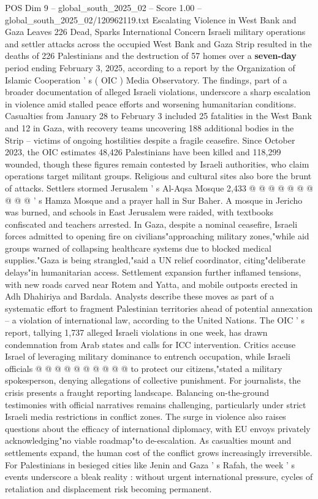 \begin{textsample}{POS Dim 9 – global\_south\_2025\_02 – Score 1.00 – global\_south\_2025\_02/120962119.txt}  \label{ex:f9_pos_399}
Escalating Violence in West Bank and Gaza Leaves 226 Dead, Sparks International Concern Israeli military operations and settler attacks across the occupied West Bank and Gaza Strip resulted in the deaths of 226 Palestinians and the destruction of 57 homes over a \textbf{seven-day} period ending February 3, 2025, according to a report by the Organization of Islamic Cooperation ' s ( OIC ) Media Observatory.
The findings, part of a broader documentation of alleged Israeli violations, underscore a sharp escalation in violence amid stalled peace efforts and worsening humanitarian conditions.
Casualties from January 28 to February 3 included 25 fatalities in the West Bank and 12 in Gaza, with recovery teams uncovering 188 additional bodies in the Strip -- victims of ongoing hostilities despite a fragile ceasefire.
Since October 2023, the OIC estimates 48,426 Palestinians have been killed and 118,299 wounded, though these figures remain contested by Israeli authorities, who claim operations target militant groups.
Religious and cultural sites also bore the brunt of attacks.
Settlers stormed Jerusalem ' s Al-Aqsa Mosque 2,433 @ @ @ @ @ @ @ @ @ @ ' s Hamza Mosque and a prayer hall in Sur Baher.
A mosque in Jericho was burned, and schools in East Jerusalem were raided, with textbooks confiscated and teachers arrested.
In Gaza, despite a nominal ceasefire, Israeli forces admitted to opening fire on civilians"approaching military zones,"while aid groups warned of collapsing healthcare systems due to blocked medical supplies."Gaza is being strangled,"said a UN relief coordinator, citing"deliberate delays"in humanitarian access.
Settlement expansion further inflamed tensions, with new roads carved near Rotem and Yatta, and mobile outposts erected in Adh Dhahiriya and Bardala.
Analysts describe these moves as part of a systematic effort to fragment Palestinian territories ahead of potential annexation -- a violation of international law, according to the United Nations.
The OIC ' s report, tallying 1,737 alleged Israeli violations in one week, has drawn condemnation from Arab states and calls for ICC intervention.
Critics accuse Israel of leveraging military dominance to entrench occupation, while Israeli officials @ @ @ @ @ @ @ @ @ @ to protect our citizens,"stated a military spokesperson, denying allegations of collective punishment.
For journalists, the crisis presents a fraught reporting landscape.
Balancing on-the-ground testimonies with official narratives remains challenging, particularly under strict Israeli media restrictions in conflict zones.
The surge in violence also raises questions about the efficacy of international diplomacy, with EU envoys privately acknowledging"no viable roadmap"to de-escalation.
As casualties mount and settlements expand, the human cost of the conflict grows increasingly irreversible.
For Palestinians in besieged cities like Jenin and Gaza ' s Rafah, the week ' s events underscore a bleak reality : without urgent international pressure, cycles of retaliation and displacement risk becoming permanent.

\end{textsample}
